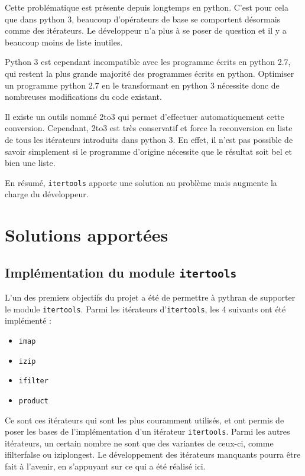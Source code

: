 \documentclass[a4paper]{article}
\begin{document}
Cette problématique est présente depuis longtemps en python. C'est
pour cela que dans python 3, beaucoup d'opérateurs de base se
comportent désormais comme des itérateurs. Le développeur n'a plus à
se poser de question et il y a beaucoup moins de liste inutiles.

Python 3 est cependant incompatible avec les programme écrits en
python 2.7, qui restent la plus grande majorité des programmes écrits
en python. Optimiser un programme python 2.7 en le transformant en
python 3 nécessite donc de nombreuses modifications du code existant.

Il existe un outils nommé 2to3 qui permet d'effectuer automatiquement
cette conversion. Cependant, 2to3 est très conservatif et force la
reconversion en liste de tous les itérateurs introduits dans python
3. En effet, il n'est pas possible de savoir simplement si le
programme d'origine nécessite que le résultat soit bel et bien une
liste.

En résumé, \texttt{itertools} apporte une solution au problème mais augmente la
charge du développeur.

\section*{Solutions apportées}

\subsection*{Implémentation du module \texttt{itertools}}

L'un des premiers objectifs du projet a été de permettre à pythran de
supporter le module \texttt{itertools}. Parmi les itérateurs d'\texttt{itertools}, les
4 suivants ont été implémenté :

\begin{itemize}
  \item \texttt{imap}
  \item \texttt{izip}
  \item \texttt{ifilter}
  \item \texttt{product}
\end{itemize}

Ce sont ces itérateurs qui sont les plus couramment utilisés, et ont
permis de poser les bases de l'implémentation d'un itérateur
\texttt{itertools}. Parmi les autres itérateurs, un certain nombre ne sont que
des variantes de ceux-ci, comme ifilterfalse ou iziplongest. Le
développement des itérateurs manquants pourra être fait à l'avenir, en
s'appuyant sur ce qui a été réalisé ici.
\end{document}
